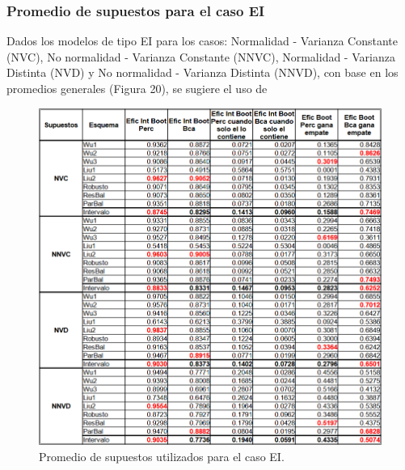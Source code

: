 \subsubsection{Promedio de supuestos para el caso EI}
Dados los modelos de tipo EI para los casos: Normalidad - Varianza Constante (NVC), No normalidad - Varianza Constante (NNVC), Normalidad - Varianza Distinta (NVD) y  No normalidad - Varianza Distinta (NNVD), con base en los promedios generales (Figura 20), se sugiere el uso de 
\begin{figure}[ht] 
	\centering 
	\includegraphics[width=0.80\linewidth]{img/EI_Prom_Supuestos.png} 
	\caption{Promedio de supuestos utilizados para el caso EI.} 
	\label{fig:EI_Supuestos}
\end{figure}






